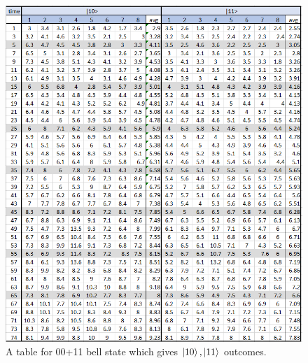 \documentclass[letterpaper]{article}
\numberwithin{equation}{section} %
\numberwithin{figure}{section} %
\numberwithin{table}{section} %
\begin{document}
\begin{figure}[h]
	\includegraphics[width=\textwidth]{t00n11b}
	\caption{A table for 00+11 bell state which gives $\ket{10}, \ket{11}$ outcomes.}
	\label{t00n11 b}
\end{figure}
\end{document}
